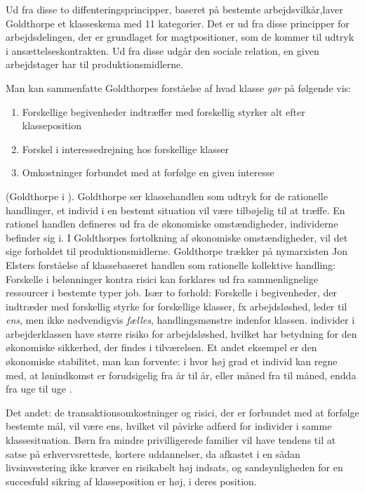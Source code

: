 Ud fra disse to diffenteringsprincipper, baseret på bestemte arbejdsvilkår,laver Goldthorpe et klasseskema med 11 kategorier. Det er ud fra disse principper for arbejdsdelingen, der er grundlaget for magtpositioner, som de kommer til udtryk i ansættelseskontrakten. Ud fra disse udgår den sociale relation, en given arbejdstager har til produktionsmidlerne. %


\label{klasse egp11}



Man kan sammenfatte Goldthorpes forståelse af hvad klasse \emph{gør} på følgende vis: 
%
\begin{enumerate}
 \itemsep-0.3em 		
 	\item Forskellige begivenheder indtræffer med forskellig styrker alt efter klasseposition
 	\item Forskel i interessedrejning hos forskellige klasser
 	\item Omkostninger forbundet med at forfølge en given interesse
\end{enumerate}
%
(Goldthorpe i \parencite[93]{Harrits2014}). Goldthorpe ser klassehandlen som  udtryk for de rationelle handlinger, et individ i en bestemt situation vil være tilbøjelig til at træffe. En rationel handlen defineres ud fra de økonomiske omstændigheder, individerne befinder sig i. I Goldthorpes fortolkning af økonomiske omstændigheder, vil det sige forholdet til produktionsmidlerne. Goldthorpe trækker på nymarxisten Jon Elsters forståelse af klassebaseret handlen som rationelle kollektive handling: Forskelle i belønninger kontra risici kan forklares ud fra sammenlignelige ressourcer i bestemte typer job. Især to forhold: Forskelle i begivenheder, der indtræder med forskellig styrke for forskellige klasser, fx arbejdsløshed, leder til \emph{ens}, men ikke nødvendigvis \emph{fælles}, handlingsmønstre indenfor klassen. individer i arbejderklassen have større risiko for arbejdsløshed, hvilket har betydning for den økonomiske sikkerhed, der findes i tilværelsen. Et andet eksempel er den økonomiske stabilitet, man kan forvente: i hvor høj grad et individ kan regne med, at lønindkomst er forudsigelig fra år til år, eller måned fra til måned, endda fra uge til uge \parencite[6, 10]{GoldthorpeMcKnight2004}.

Det andet: de transaktionsomkostninger og risici, der er forbundet med at forfølge bestemte mål, vil være ens, hvilket vil påvirke adfærd for individer i samme klassesituation. Børn fra mindre privilligerede familier vil have tendens til at satse på erhvervsrettede, kortere uddannelser, da afkastet i en sådan livsinvestering ikke kræver en risikabelt høj indsats, og sandsynligheden for en succesfuld sikring af klasseposition er høj, i deres position. 


